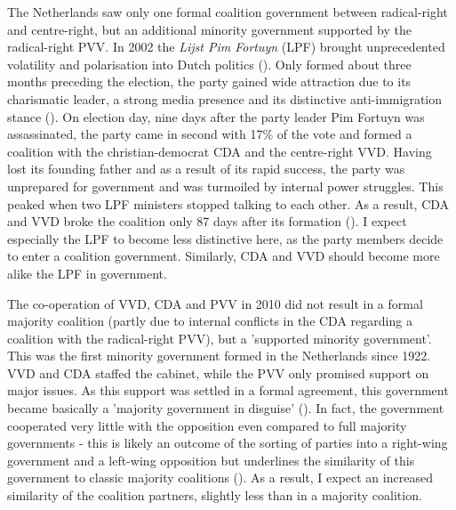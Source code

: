 \documentclass{article}
\begin{document}
The Netherlands saw only one formal coalition government between radical-right and centre-right, but an additional minority government supported by the radical-right PVV. In 2002 the \textit{Lijst Pim Fortuyn} (LPF) brought unprecedented volatility and polarisation into Dutch politics (\cite{Bischof2019a, VanderBrug2003}). Only formed about three months preceding the election, the party gained wide attraction due to its charismatic leader, a strong media presence and its distinctive anti-immigration stance (\cite{Koopmans2009}). On election day, nine days after the party leader Pim Fortuyn was assassinated, the party came in second with 17\% of the vote and formed a coalition with the christian-democrat CDA and the centre-right VVD. Having lost its founding father and as a result of its rapid success, the party was unprepared for government and was turmoiled by internal power struggles. This peaked when two LPF ministers stopped talking to each other. As a result, CDA and VVD broke the coalition only 87 days after its formation (\cite{Heinisch2003, Lucardie2007LPF}). I expect especially the LPF to become less distinctive here, as the party members decide to enter a coalition government. Similarly, CDA and VVD should become more alike the LPF in government.\par

The co-operation of VVD, CDA and PVV in 2010 did not result in a formal majority coalition (partly due to internal conflicts in the CDA regarding a coalition with the radical-right PVV), but a 'supported minority government'. This was the first minority government formed in the Netherlands since 1922. VVD and CDA staffed the cabinet, while the PVV only promised support on major issues. As this support was settled in a formal agreement, this government became basically a 'majority government in disguise' (\cite{Strom1990, VanHolsteyn2011}). In fact, the government cooperated very little with the opposition even compared to full majority governments - this is likely an outcome of the sorting of parties into a right-wing government and a left-wing opposition but underlines the similarity of this government to classic majority coalitions (\cite{Otjes2014}). As a result, I expect an increased similarity of the coalition partners, slightly less than in a majority coalition. \par
\end{document}

